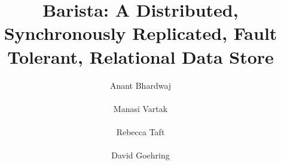\documentclass{vldb}
\begin{document}
\title{\hspace{-10pt} Barista: A Distributed, Synchronously Replicated, Fault Tolerant, Relational Data Store}

\author{
\alignauthor
\hspace{-45pt}Anant Bhardwaj\\
       \\
\alignauthor
\hspace{-85pt}Manasi Vartak\\
       \\
\alignauthor
\hspace{-110pt}Rebecca Taft\\
       \\
\alignauthor
\hspace{-145pt}David Goehring\\
       \\
}

\maketitle



\end{document}
